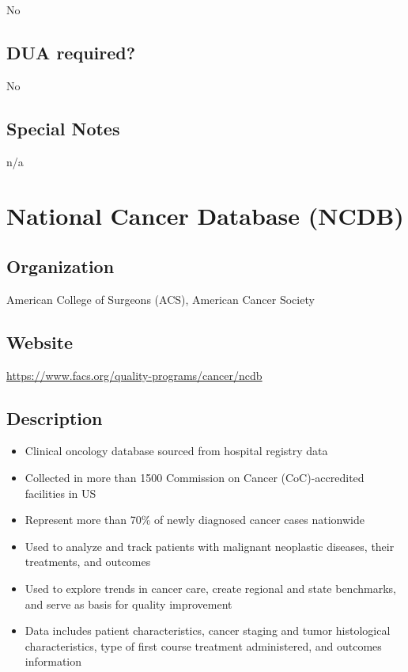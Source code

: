 \documentclass[
]{book}
\providecommand{\tightlist}{%
  \setlength{\itemsep}{0pt}\setlength{\parskip}{0pt}}
\begin{document}
No

\hypertarget{dua-required-44}{%
\section{DUA required?}\label{dua-required-44}}

No

\hypertarget{special-notes-44}{%
\section{Special Notes}\label{special-notes-44}}

n/a

\mainmatter

\hypertarget{national-cancer-database-ncdb}{%
\chapter{National Cancer Database (NCDB)}\label{national-cancer-database-ncdb}}

\hypertarget{organization-45}{%
\section{Organization}\label{organization-45}}

American College of Surgeons (ACS), American Cancer Society

\hypertarget{website-45}{%
\section{Website}\label{website-45}}

\url{https://www.facs.org/quality-programs/cancer/ncdb}

\hypertarget{description-45}{%
\section{Description}\label{description-45}}

\begin{itemize}
\tightlist
\item
  Clinical oncology database sourced from hospital registry data
\item
  Collected in more than 1500 Commission on Cancer (CoC)-accredited facilities in US
\item
  Represent more than 70\% of newly diagnosed cancer cases nationwide
\item
  Used to analyze and track patients with malignant neoplastic diseases, their treatments, and outcomes
\item
  Used to explore trends in cancer care, create regional and state benchmarks, and serve as basis for quality improvement
\item
  Data includes patient characteristics, cancer staging and tumor histological characteristics, type of first course treatment administered, and outcomes information
\end{itemize}
\end{document}
